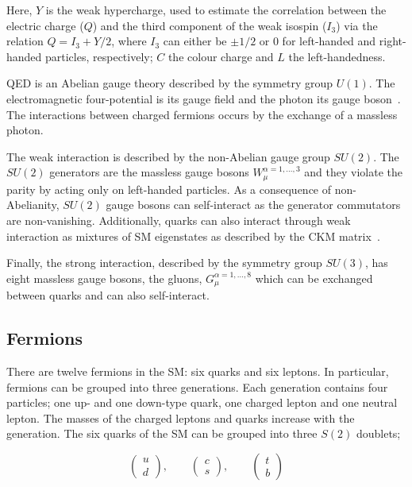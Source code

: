 			\noindent Here, $Y$ is the weak hypercharge, used to estimate the correlation between the electric charge ($Q$) and the third component of the weak isospin ($I_3$) via the relation $Q = I_3 + Y/2$, where $I_3$ can either be $\pm 1/2$ or $0$ for left-handed and right-handed particles, respectively; $C$ the colour charge and $L$ the left-handedness. 


			QED is an Abelian gauge theory described by the symmetry group $U(1)$. The electromagnetic four-potential is its gauge field and the photon its gauge boson~\cite{Pich2012}. The interactions between charged fermions occurs by the exchange of a massless photon. 

			The weak interaction is described by the non-Abelian gauge group $SU(2)$. The $SU(2)$ generators are the massless gauge bosons $W_{\mu}^{\alpha = 1,\dots,3}$ and they violate the parity by acting only on left-handed particles. As a consequence of non-Abelianity, $SU(2)$ gauge bosons can self-interact as the generator commutators are non-vanishing. Additionally, quarks can also interact through weak interaction as mixtures of SM eigenstates as described by the CKM matrix~\cite{Olive2014}.

			Finally, the strong interaction, described by the symmetry group $SU(3)$, has eight massless gauge bosons, the gluons, $G_{\mu}^{\alpha=1,\dots,8}$ which can be exchanged between quarks and can also self-interact. 



		\subsection*{Fermions}

			There are twelve fermions in the SM: six quarks and six leptons. In particular, fermions can be grouped into three generations. Each generation contains four particles; one up- and one down-type quark, one charged lepton and one neutral lepton. The masses of the charged leptons and quarks increase with the generation. The six quarks of the SM can be grouped into three $S(2)$ doublets;

			\begin{equation*}
			\label{eq:quark_doublets}
				\begin{pmatrix} u \\ d \end{pmatrix}, \qquad 
				\begin{pmatrix} c \\ s \end{pmatrix}, \qquad 
				\begin{pmatrix} t \\ b \end{pmatrix}
			\end{equation*}

